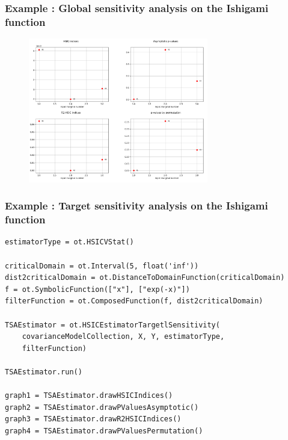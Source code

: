 \documentclass[aspectratio=169]{beamer}
\begin{document}
\begin{frame}
\frametitle{Example : Global sensitivity analysis on the Ishigami function}

\begin{figure}
   \includegraphics[width=0.7\textwidth]{figures/HSIC1.png}
\end{figure}
\end{frame}




\begin{frame}[containsverbatim]	
\frametitle{Example : Target sensitivity analysis on the Ishigami function}
\begin{small}

\begin{lstlisting}
estimatorType = ot.HSICVStat()

criticalDomain = ot.Interval(5, float('inf'))
dist2criticalDomain = ot.DistanceToDomainFunction(criticalDomain)
f = ot.SymbolicFunction(["x"], ["exp(-x)"])
filterFunction = ot.ComposedFunction(f, dist2criticalDomain)

TSAEstimator = ot.HSICEstimatorTargetlSensitivity(
    covarianceModelCollection, X, Y, estimatorType, 
    filterFunction)
    
TSAEstimator.run()

graph1 = TSAEstimator.drawHSICIndices()
graph2 = TSAEstimator.drawPValuesAsymptotic()
graph3 = TSAEstimator.drawR2HSICIndices()
graph4 = TSAEstimator.drawPValuesPermutation()
\end{lstlisting}

\end{small}
\end{frame}
\end{document}
